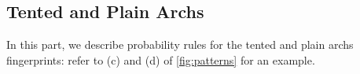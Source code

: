 \documentclass[8pt]{article}
\begin{document}
\subsection{Tented and Plain Archs}
%
%
In this part, we describe probability rules for the tented and plain archs
fingerprints: refer to (c) and (d) of \cref{fig:patterns} for an example.
\end{document}
